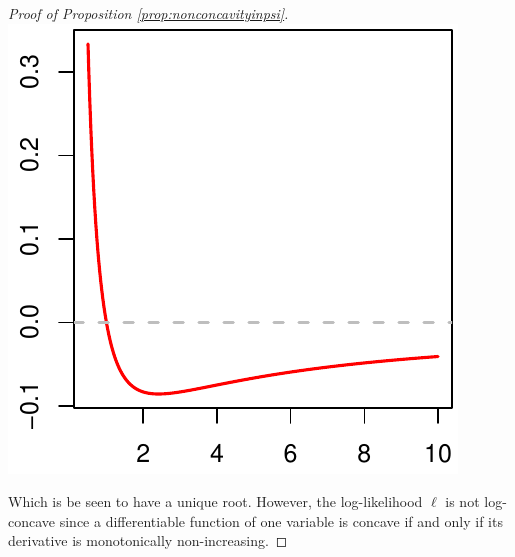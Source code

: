 \documentclass{article}\usepackage[]{graphicx}\usepackage[]{color}
\makeatletter
\def\maxwidth{ %
  \ifdim\Gin@nat@width>\linewidth
    \linewidth
  \else
    \Gin@nat@width
  \fi
}
\newenvironment{knitrout}{}{} %
\makeatother
\begin{document}
\begin{proof}[Proof of Proposition \ref{prop:nonconcavityinpsi}]
\begin{knitrout}
\includegraphics[width=\maxwidth]{figure/one_dimensional_loglik} 

\end{knitrout}
Which is be seen to have a unique root.
However, the log-likelihood $\ell$ is not log-concave since a differentiable function of one variable is concave if and only if its derivative is monotonically non-increasing.
\end{proof}
\end{document}
